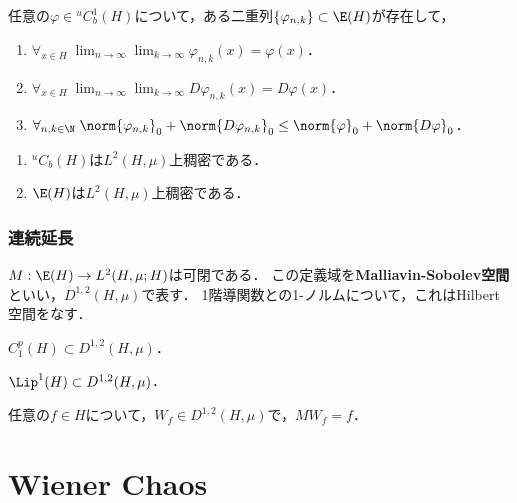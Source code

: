 \documentclass[uplatex,dvipdfmx]{jsreport}
\begin{document}
\begin{proposition}
    任意の$\varphi\in{}^uC_b^1(H)$について，ある二重列$\{\varphi_{n,k}\}\subset\E(H)$が存在して，
    \begin{enumerate}
        \item $\forall_{x\in H}\;\lim_{n\to\infty}\lim_{k\to\infty}\varphi_{n,k}(x)=\varphi(x)$．
        \item $\forall_{x\in H}\;\lim_{n\to\infty}\lim_{k\to\infty}D\varphi_{n,k}(x)=D\varphi(x)$．
        \item $\forall_{n,k\in\N}\;\norm{\varphi_{n,k}}_0+\norm{D\varphi_{n,k}}_0\le\norm{\varphi}_0+\norm{D\varphi}_0$．
    \end{enumerate}
\end{proposition}

\begin{corollary}\mbox{}
    \begin{enumerate}
        \item ${}^uC_b(H)$は$L^2(H,\mu)$上稠密である．
        \item $\E(H)$は$L^2(H,\mu)$上稠密である．
    \end{enumerate}
\end{corollary}

\subsection{連続延長}

\begin{proposition}
    $M:\E(H)\to L^2(H,\mu;H)$は可閉である．
    この定義域を\textbf{Malliavin-Sobolev空間}といい，$D^{1,2}(H,\mu)$で表す．
    1階導関数との1-ノルムについて，これはHilbert空間をなす．
\end{proposition}

\begin{proposition}[$C^1$-級緩増加関数はMalliavin微分可能である]
    $C_1^p(H)\subset D^{1,2}(H,\mu)$．
\end{proposition}

\begin{proposition}[Lipschitz関数はMalliavin微分可能である]
    $\Lip^1(H)\subset D^{1,2}(H,\mu)$．
\end{proposition}

\begin{proposition}[微分積分学の基本定理?]
    任意の$f\in H$について，$W_f\in D^{1,2}(H,\mu)$で，$MW_f=f$．
\end{proposition}

\chapter{Wiener Chaos}
\end{document}
